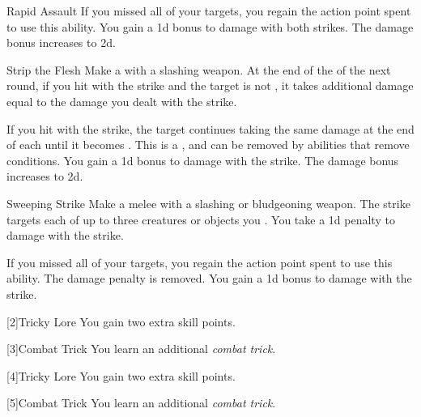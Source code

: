 {\begin{ability}{Rapid Assault}
                \rankline
                 If you missed all of your targets, you regain the action point spent to use this ability.
                 You gain a \plus1d bonus to damage with both strikes.
                 The damage bonus increases to \plus2d.
            \end{ability}

            \begin{ability}{Strip the Flesh}
                Make a  with a slashing weapon.
                At the end of the  of the next round, if you hit with the strike and the target is not , it takes additional damage equal to the damage you dealt with the strike.

                \rankline
                 If you hit with the strike, the target continues taking the same damage at the end of each  until it becomes .
                This is a , and can be removed by abilities that remove conditions.
                 You gain a \plus1d bonus to damage with the strike.
                 The damage bonus increases to \plus2d.
            \end{ability}

            \begin{ability}{Sweeping Strike}
                Make a melee  with a slashing or bludgeoning weapon.
                The strike targets each of up to three creatures or objects you .
                You take a \minus1d penalty to damage with the strike.

                \rankline
                 If you missed all of your targets, you regain the action point spent to use this ability.
                 The damage penalty is removed.
                 You gain a \plus1d bonus to damage with the strike.
            \end{ability}
        }

        [2]{Tricky Lore} You gain two extra skill points.

        [3]{Combat Trick}
        You learn an additional \textit{combat trick}.

        [4]{Tricky Lore} You gain two extra skill points.

        [5]{Combat Trick}
        You learn an additional \textit{combat trick}.

